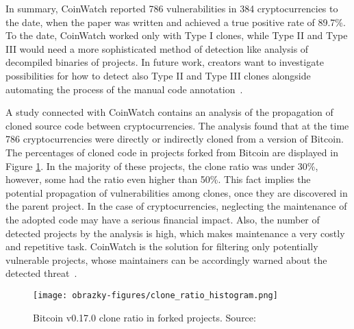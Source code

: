     In summary, CoinWatch reported 786 vulnerabilities in 384 cryptocurrencies to the date, when the paper
    was written and achieved a true positive rate of 89.7\%. To the date, CoinWatch worked only with Type I
    clones, while Type II and Type III would need a more sophisticated method of detection like analysis of
    decompiled binaries of projects. In future work, creators want to investigate possibilities for how to
    detect also Type II and Type III clones alongside automating the process of the manual code
    annotation~\cite{CoinWatch}.

    A study connected with CoinWatch contains an analysis of the propagation of cloned source code between
    cryptocurrencies. The analysis found that at the time 786 cryptocurrencies were directly or indirectly
    cloned from a version of Bitcoin. The percentages of cloned code in projects forked from Bitcoin
    are displayed in Figure \ref{bitcoin-clone-ratio}. In the majority of these projects, the clone ratio was
    under 30\%, however, some had the ratio even higher than 50\%. This fact implies the potential propagation
    of vulnerabilities among clones, once they are discovered in the parent project. In the case of
    cryptocurrencies, neglecting the maintenance of the adopted code may have a serious financial impact.
    Also, the number of detected projects by the analysis is high, which makes maintenance a very costly
    and repetitive task. CoinWatch is the solution for filtering only potentially vulnerable projects,
    whose maintainers can be accordingly warned about the detected threat~\cite{CoinWatch}.

    \begin{figure}[h]
      \centering
      \texttt{[image: obrazky-figures/clone\_ratio\_histogram.png]}
      \caption{Bitcoin v0.17.0 clone ratio in forked projects. Source:~\cite{CoinWatch}}
      \label{bitcoin-clone-ratio}
    \end{figure}

